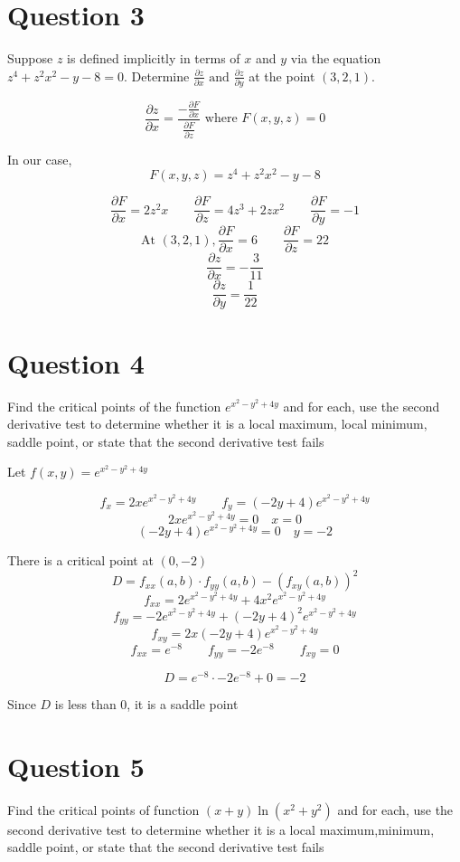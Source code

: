 \documentclass[hidelinks]{article}
\begin{document}
\section{Question 3}
Suppose $z$ is defined implicitly in terms of $x$ and $y$ via the equation $z^4 +z ^2 x^2 - y - 8 = 0$. Determine $\frac{\partial z}{\partial x} \text{ and } \frac{\partial z}{\partial y}$ at the point $(3, 2, 1)$.

\[
	\frac{\partial z}{\partial x} = \frac{-\frac{\partial F}{\partial x}}{\frac{\partial F}{\partial z}} \text{ where } F(x, y, z) = 0
\]

In our case, 
\[
	F(x, y, z) = z^4 + z^2x^2 - y -8
\]

\[
\frac{\partial F}{\partial x} = 2z^2x \quad \quad \frac{\partial F}{\partial z} = 4z^3 + 2zx^2 \quad \quad \frac{\partial F}{\partial y} = -1
\]
\[
	\text{At }(3, 2, 1), \frac{\partial F}{\partial x} = 6 \quad \quad \frac{\partial F}{\partial z} = 22
\]
\[
	\frac{\partial z}{\partial x} = -\frac{3}{11}
\]
\[
\frac{\partial z}{\partial y} = \frac{1}{22}
\]

\newpage
\section{Question 4}
Find the critical points of the function $e^{x^2-y^2+4y}$ and for each, use the second
derivative test to determine whether it is a local maximum, local minimum, saddle point,
or state that the second derivative test fails

Let $f(x, y)  = e^{x^2-y^2+4y}$

\[
	f_x = 2xe^{x^2-y^2+4y} \quad \quad f_y = (-2y+4) e^{x^2-y^2+4y}
\]
\[
	2xe^{x^2-y^2+4y} = 0 \quad x = 0 
\]
\[
(-2y+4) e^{x^2-y^2+4y} = 0 \quad y = -2
\]

There is a critical point at $(0, -2)$
\[
	D = f_{xx}(a, b) \cdot f_{yy}(a, b) - (f_{xy}(a, b))^2
\]
\[
f_{xx} = 2e^{x^2-y^2+4y} + 4x^2e^{x^2-y^2+4y}
\]
\[
	f_{yy} = -2e^{x^2-y^2+4y} + (-2y+4)^2e^{x^2-y^2+4y}
\]
\[
	f_{xy} = 2x(-2y+4)e^{x^2-y^2+4y}
\]
\[
	f_{xx} = e^{-8} \quad \quad f_{yy} = -2e^{-8} \quad \quad f_{xy} = 0
\]

\[
	D = e^{-8} \cdot -2e^{-8} + 0 = -2
\]

Since $D$ is less than 0, it is a saddle point 
\newpage
\section{Question 5}
Find the critical points of function $(x + y)\ln(x^2+y^2)$ and for each, use the second derivative test to determine whether it is a local maximum,minimum, saddle point, or state that the second derivative test fails
\end{document}
